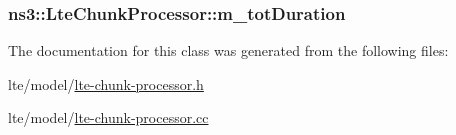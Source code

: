 \subsubsection[{\texorpdfstring{m\+\_\+tot\+Duration}{m_totDuration}}]{ ns3\+::\+Lte\+Chunk\+Processor\+::m\+\_\+tot\+Duration\hspace{0.3cm}{\ttfamily [private]}}\hypertarget{classns3_1_1LteChunkProcessor_ac2cb1b59dff73aa02a7ced8c10f32442}{}\label{classns3_1_1LteChunkProcessor_ac2cb1b59dff73aa02a7ced8c10f32442}


The documentation for this class was generated from the following files\+:\begin{DoxyCompactItemize}
\item 
lte/model/\hyperlink{lte-chunk-processor_8h}{lte-\/chunk-\/processor.\+h}\item 
lte/model/\hyperlink{lte-chunk-processor_8cc}{lte-\/chunk-\/processor.\+cc}\end{DoxyCompactItemize}
